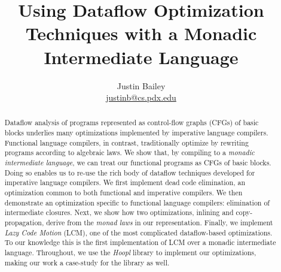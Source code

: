 \documentclass[12pt]{article}
\makeatletter
\newcommand{\authorEmail}{\url{justinb@cs.pdx.edu}}
\makeatother
\begin{document}
           {\date{}
             \author{Justin Bailey \\ \authorEmail}
             \title{Using Dataflow Optimization Techniques with a Monadic Intermediate Language}

             \VerbatimFootnotes
             \DefineShortVerb{\#}
             \doublespacing}{}

\maketitle

\renewcommand{\abstractnamefont}{\normalfont\small\sffamily\bfseries}
\begin{abstract}
  Dataflow analysis of programs represented as control-flow graphs
  (CFGs) of basic blocks underlies many optimizations implemented by
  imperative language compilers. Functional language compilers, in
  contrast, traditionally optimize by rewriting programs according to
  algebraic laws. We show that, by compiling to a \emph{monadic
    intermediate language}, we can treat our functional programs as
  CFGs of basic blocks. Doing so enables us to re-use the rich body of
  dataflow techniques developed for imperative language compilers. We
  first implement dead code elimination, an optimization common to
  both functional and imperative compilers. We then demonstrate an
  optimization specific to functional language compilers: elimination
  of intermediate closures. Next, we show how two optimizations,
  inlining and copy-propagation, derive from the \emph{monad laws} in
  our representation. Finally, we implement \emph{Lazy Code Motion}
  (LCM), one of the most complicated dataflow-based optimizations. To
  our knowledge this is the first implementation of LCM over a monadic
  intermediate language. Throughout, we use the \emph{Hoopl} library
  to implement our optimizations, making our work a case-study for the
  library as well.
\end{abstract}
\end{document}
